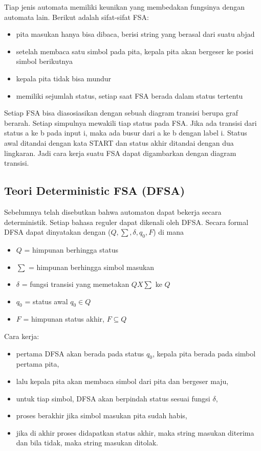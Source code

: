 Tiap jenis automata memiliki keunikan yang membedakan fungsinya dengan automata lain. Berikut adalah sifat-sifat FSA:

\begin{itemize}
	\item pita masukan hanya bisa dibaca, berisi string yang berasal dari suatu abjad
	\item setelah membaca satu simbol pada pita, kepala pita akan bergeser ke posisi simbol berikutnya
	\item kepala pita tidak bisa mundur
	\item memiliki sejumlah status, setiap saat FSA berada dalam status tertentu
\end{itemize}

Setiap FSA bisa diasosiasikan dengan sebuah diagram transisi berupa graf berarah. Setiap simpulnya mewakili tiap status pada FSA. Jika ada transisi dari status a ke b pada input i, maka ada busur dari a ke b dengan label i. Status awal ditandai dengan kata START dan status akhir ditandai dengan dua lingkaran. Jadi cara kerja suatu FSA dapat digambarkan dengan diagram transisi.

\subsection{Teori Deterministic FSA (DFSA)}

Sebelumnya telah disebutkan bahwa automaton dapat bekerja secara deterministik. Setiap bahasa reguler dapat dikenali oleh DFSA. Secara formal DFSA dapat dinyatakan dengan ($Q,\sum,\delta,q_0,F$) di mana

\begin{itemize}
	\item $Q$ = himpunan berhingga status
	\item $\sum$ = himpunan berhingga simbol masukan
	\item $\delta$ = fungsi transisi yang memetakan $Q X \sum$ ke $Q$
	\item $q_0$ = status awal $q_0 \in Q$
	\item $F$ = himpunan status akhir, $F \subseteq Q$
\end{itemize}

Cara kerja:

\begin{itemize}
	\item pertama DFSA akan berada pada status $q_0$, kepala pita berada pada simbol pertama pita,
	\item lalu kepala pita akan membaca simbol dari pita dan bergeser maju,
	\item untuk tiap simbol, DFSA akan berpindah status sesuai fungsi $\delta$,
	\item proses berakhir jika simbol masukan pita sudah habis,
	\item jika di akhir proses didapatkan status akhir, maka string masukan diterima dan bila tidak, maka string masukan ditolak.
\end{itemize}

